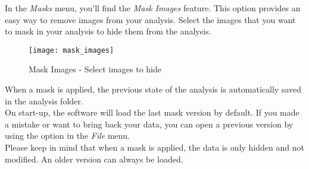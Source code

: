 \indent\indent In the \textit{Masks} menu, you'll find the \textit{Mask Images} feature. This option provides an easy way to remove images from your analysis. Select the images that you want to mask in your analysis to hide them from the analysis.\\

\begin{figure}[!h]
   \centering
   \texttt{[image: mask\_images]}
   \caption{Mask Images - Select images to hide}
\end{figure}

\newline
\indent When a mask is applied, the previous state of the analysis is automatically saved in the analysis folder.\\
On start-up, the software will load the last mask version by default. If you made a mistake or want to bring back your data, you can open a previous version by using the  option in the \textit{File} menu.\\
\newline
\indent Please keep in mind that when a mask is applied, the data is only hidden and not modified. An older version can always be loaded.

